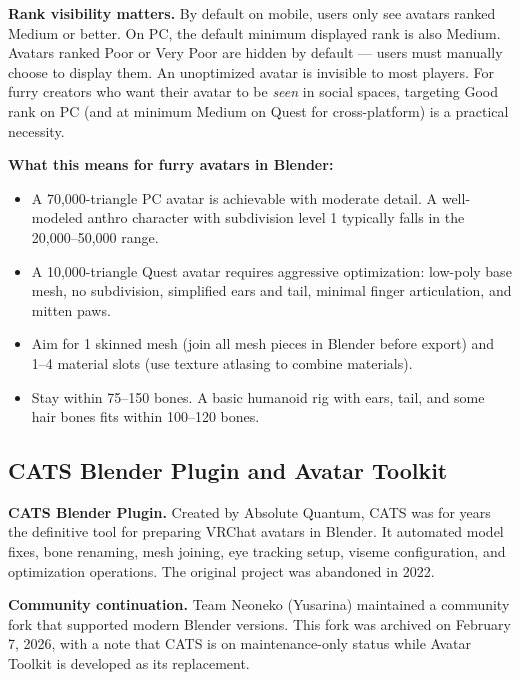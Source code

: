 \begin{warningbox}
\textbf{Rank visibility matters.} By default on mobile, users only see avatars ranked Medium or better. On PC, the default minimum displayed rank is also Medium. Avatars ranked Poor or Very Poor are hidden by default --- users must manually choose to display them. An unoptimized avatar is invisible to most players. For furry creators who want their avatar to be \emph{seen} in social spaces, targeting Good rank on PC (and at minimum Medium on Quest for cross-platform) is a practical necessity.
\end{warningbox}

\textbf{What this means for furry avatars in Blender:}

\begin{itemize}[leftmargin=2em]
  \item A 70,000-triangle PC avatar is achievable with moderate detail. A well-modeled anthro character with subdivision level 1 typically falls in the 20,000--50,000 range.
  \item A 10,000-triangle Quest avatar requires aggressive optimization: low-poly base mesh, no subdivision, simplified ears and tail, minimal finger articulation, and mitten paws.
  \item Aim for 1 skinned mesh (join all mesh pieces in Blender before export) and 1--4 material slots (use texture atlasing to combine materials).
  \item Stay within 75--150 bones. A basic humanoid rig with ears, tail, and some hair bones fits within 100--120 bones.
\end{itemize}


\subsection{CATS Blender Plugin and Avatar Toolkit}
\label{subsec:cats-toolkit}

\textbf{CATS Blender Plugin.} Created by Absolute Quantum, CATS was for years the definitive tool for preparing VRChat avatars in Blender. It automated model fixes, bone renaming, mesh joining, eye tracking setup, viseme configuration, and optimization operations. The original project was abandoned in 2022.

\textbf{Community continuation.} Team Neoneko (Yusarina) maintained a community fork that supported modern Blender versions. This fork was archived on February 7, 2026, with a note that CATS is on maintenance-only status while Avatar Toolkit is developed as its replacement.

